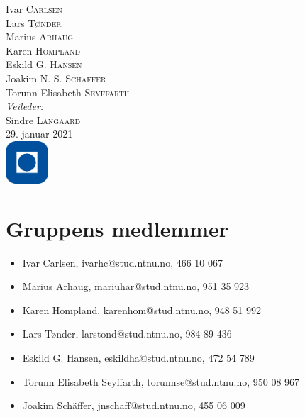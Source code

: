 \documentclass[11pt]{article}
\begin{document}
\begin{titlepage}
		\Large %
		Ivar \textsc{Carlsen}\\
		Lars \textsc{Tønder} \\
		Marius \textsc{Arhaug} \\
		Karen \textsc{Hompland} \\
		Eskild G. \textsc{Hansen} \\
		Joakim N. S. \textsc{Schäffer} \\
		Torunn Elisabeth \textsc{Seyffarth} \\
		\emph{Veileder:}\\
		Sindre \textsc{Langaard}\\
		
		
		\vfill
		{\large 29. januar 2021}\\[2cm]
		
		
		\includegraphics[width=60px, keepaspectratio]{ntnulogo.eps}\\[1cm]
		
		
		\vfill %
		
	\end{titlepage}
	
	\section{Gruppens medlemmer}
	\begin{itemize}
		\item[] Ivar Carlsen, ivarhc@stud.ntnu.no, 466 10 067
		\item[] Marius Arhaug, mariuhar@stud.ntnu.no, 951 35 923
		\item[] Karen Hompland, karenhom@stud.ntnu.no, 948 51 992
		\item[] Lars Tønder, larstond@stud.ntnu.no, 984 89 436
		\item[] Eskild G. Hansen, eskildha@stud.ntnu.no, 472 54 789
		\item[] Torunn Elisabeth Seyffarth, torunnse@stud.ntnu.no, 950 08 967
		\item[] Joakim Schäffer, jnschaff@stud.ntnu.no, 455 06 009
	\end{itemize}
	
\end{document}
